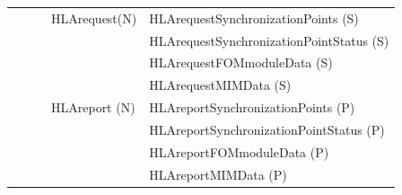 \begin{compactstdpage}
\begin{momtabletypeset}[8.00]
{{\begin{tabular}{|Y{76.87pt}|Y{60.44pt}|Y{67.64pt}|Y{54.56pt}|Y{156.97pt}|}
                    & &                   & HLArequest\newline (N) & HLArequestSynchronizationPoints (S)                         \\
                    & &                   &                        & HLArequestSynchronizationPointStatus (S)                    \\
                    & &                   &                        & HLArequestFOMmoduleData (S)                                 \\
                    & &                   &                        & HLArequestMIMData (S)                                       \\
                    & &                   & HLAreport (N)          & HLAreportSynchronizationPoints (P)                          \\
                    & &                   &                        & HLAreportSynchronizationPointStatus (P)                     \\
                    & &                   &                        & HLAreportFOMmoduleData (P)                                  \\
                    & &                   &                        & HLAreportMIMData (P)                                        \\
                    \hline
                \end{tabular}%
            }%
        }%
    \end{momtabletypeset}
\end{compactstdpage}
\clearpage

